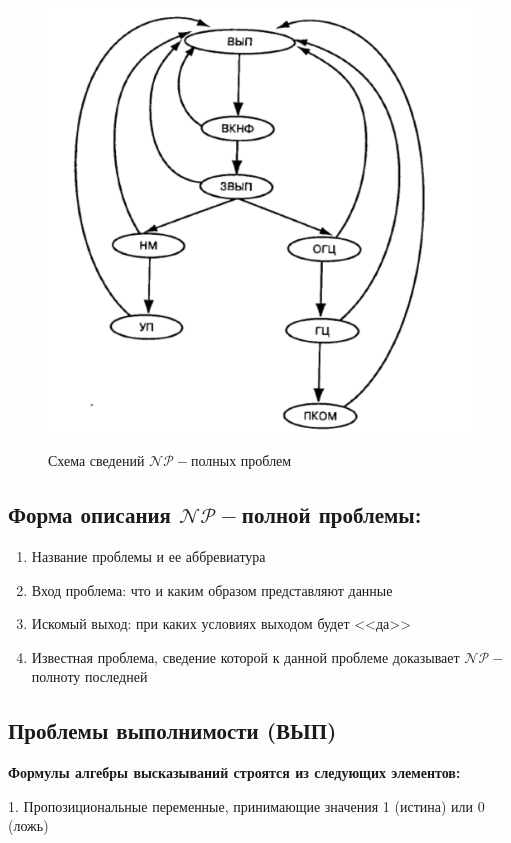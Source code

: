 \begin{figure}[H]
    \centering
    \includegraphics[height = 12cm]{images/np.png}
    \caption{Схема сведений $\mathscr{NP-}$полных проблем}
\end{figure}

\subsection*{Форма описания $\mathscr{NP}-$полной проблемы:}
\begin{enumerate}
    \item Название проблемы и ее аббревиатура
    \item Вход проблема: что и каким образом представляют данные
    \item Искомый выход: при каких условиях выходом будет <<да>>
    \item Известная проблема, сведение которой к данной проблеме доказывает $\mathscr{NP}-$полноту последней
\end{enumerate}

\subsection*{Проблемы выполнимости (ВЫП)}
\textbf{Формулы алгебры высказываний строятся из следующих элементов:}

1. Пропозициональные переменные, принимающие значения 1 (истина) или 0 (ложь)

